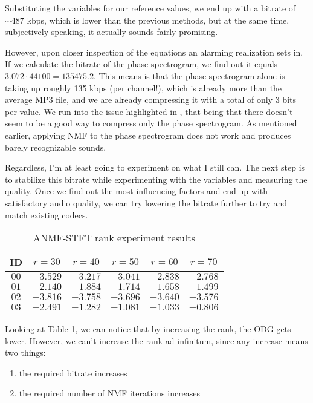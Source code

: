 Substituting the variables for our reference values, we end up with a bitrate of $\sim 487$ kbps, which is lower than the previous methods, but at the same time, subjectively speaking, it actually sounds fairly promising.

However, upon closer inspection of the equations an alarming realization sets in. If we calculate the bitrate of the phase spectrogram, we find out it equals $3.072 \cdot 44100 = 135475.2$. This means is that the phase spectrogram alone is taking up roughly 135 kbps (per channel!), which is already more than the average MP3 file, and we are already compressing it with a total of only 3 bits per value. We run into the issue highlighted in \cite{nikunen_2010}, that being that there doesn't seem to be a good way to compress only the phase spectrogram. As mentioned earlier, applying NMF to the phase spectrogram does not work and produces barely recognizable sounds.

Regardless, I'm at least going to experiment on what I still can. The next step is to stabilize this bitrate while experimenting with the variables and measuring the quality. Once we find out the most influencing factors and end up with satisfactory audio quality, we can try lowering the bitrate further to try and match existing codecs.

\begin{table}[htbp]\caption{ANMF-STFT rank experiment results}
	\label{tab:anmf_stft_rank}
	\centering
	\begin{tabular}{|c|c|c|c|c|c|}
		\hline
		ID & $r=30$ & $r=40$ & $r=50$ & $r=60$ & $r=70$ \\ \hline
		$00$ & $-3.529$ & $-3.217$ & $-3.041$ & $-2.838$ & $-2.768$ \\
		$01$ & $-2.140$ & $-1.884$ & $-1.714$ & $-1.658$ & $-1.499$ \\
		$02$ & $-3.816$ & $-3.758$ & $-3.696$ & $-3.640$ & $-3.576$ \\
		$03$ & $-2.491$ & $-1.282$ & $-1.081$ & $-1.033$ & $-0.806$	\\
		\hline
	\end{tabular}
\end{table}

Looking at Table \ref{tab:anmf_stft_rank}, we can notice that by increasing the rank, the ODG gets lower. However, we can't increase the rank ad infinitum, since any increase means two things:

\begin{enumerate}
	\item the required bitrate increases
	\item the required number of NMF iterations increases
\end{enumerate}

